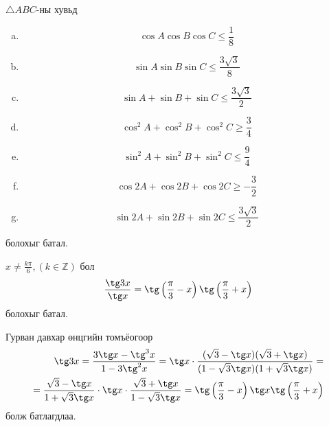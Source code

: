 \documentclass[10pt,a4paper,oneside]{book}
\begin{document}
\TheSolution

\Problem
$\triangle ABC$-ны хувьд
\begin{enumerate}[(a)]
\item
\begin{equation*}
\cos A \cos B \cos C \leq \frac{1}{8}
\end{equation*}
\item
\begin{equation*}
\sin A \sin B \sin C \leq \frac{3\sqrt{3}}{8}
\end{equation*}
\item
\begin{equation*}
\sin A + \sin B + \sin C \leq \frac{3\sqrt{3}}{2}
\end{equation*}
\item
\begin{equation*}
\cos^2 A + \cos^2 B + \cos^2 C \geq \frac{3}{4}
\end{equation*}
\item
\begin{equation*}
\sin^2 A + \sin^2 B + \sin^2 C \leq \frac{9}{4}
\end{equation*}
\item
\begin{equation*}
\cos 2A + \cos 2B + \cos 2C \geq -\frac{3}{2}
\end{equation*}
\item
\begin{equation*}
\sin 2A + \sin 2B + \sin 2C \leq \frac{3\sqrt{3}}{2}
\end{equation*}
\end{enumerate}
болохыг батал.

\TheSolution

\Problem
$x \neq \frac{k\pi}{6}, (k \in \mathbb{Z})$ бол 
\begin{equation*}
\frac{\tg 3x}{\tg x} = \tg \left(\frac{\pi}{3}-x \right)\tg \left(\frac{\pi}{3} + x\right)
\end{equation*}
болохыг батал.

\TheSolution
Гурван давхар өнцгийн томъёогоор
\begin{align*}
\tg 3x = \frac{3\tg x - \tg^3 x}{1-3\tg^2 x} = \tg x \cdot \frac{(\sqrt{3}-\tg x)(\sqrt{3}+\tg x)}{(1-\sqrt{3}\tg x)(1+\sqrt{3}\tg x)} = \\
= \frac{\sqrt{3}-\tg x}{1+\sqrt{3}\tg x}\cdot\tg x\cdot \frac{\sqrt{3}+\tg x}{1-\sqrt{3}\tg x} =
\tg \left(\frac{\pi}{3}-x\right)\tg x \tg \left(\frac{\pi}{3} + x\right)
\end{align*}
болж батлагдлаа.
\end{document}
